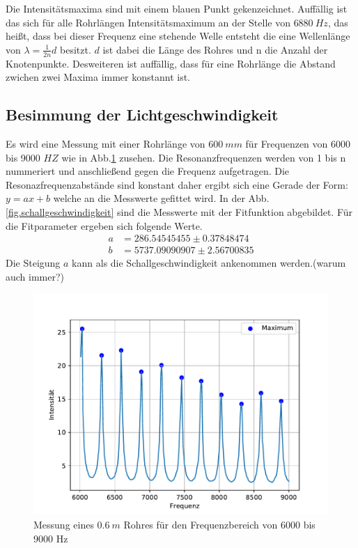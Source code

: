 Die Intensitätsmaxima sind mit einem blauen Punkt gekenzeichnet.
Auffällig ist das sich für alle Rohrlängen Intensitätsmaximum an der Stelle von $\SI{6880}{Hz}$, das heißt, dass bei dieser Frequenz eine stehende Welle entsteht die eine Wellenlänge von $\lambda=\frac{1}{2n}d$ besitzt.
$d$ ist dabei die Länge des Rohres und n die Anzahl der Knotenpunkte.
Desweiteren ist auffällig, dass für eine Rohrlänge die Abstand zwichen zwei Maxima immer konstannt ist.

\subsection{Besimmung der Lichtgeschwindigkeit}
Es wird eine Messung mit einer Rohrlänge von $\SI{600}{mm}$ für Frequenzen von 6000 bis 9000 $\si{HZ}$ wie in Abb.\ref{fig.frequenz/rohrlänge} zusehen.
Die Resonanzfrequenzen werden von 1 bis n nummeriert und anschließend gegen die Frequenz aufgetragen.
Die Resonazfrequenzabstände sind konstant daher ergibt sich eine Gerade der Form: $y=ax+b$ welche an die Messwerte gefittet wird.
In der Abb. \ref{fig.schallgeschwindigkeit} sind die Messwerte mit der Fitfunktion abgebildet.
Für die Fitparameter ergeben sich folgende Werte.
\begin{align*}
  a &= 286.54545455 \pm 0.37848474\\
  b &= 5737.09090907 \pm 2.56700835
\end{align*}
Die Steigung $a$ kann als die Schallgeschwindigkeit ankenommen werden.(warum auch immer?)
\begin{figure}[h!]
  \centering
  \includegraphics[width=\textwidth]{A1L8x75mmF6000-9000S10.pdf}
  \caption{Messung eines $\SI{0.6}{m}$ Rohres für den Frequenzbereich von 6000 bis 9000 Hz}
  \label{fig.frequenz/rohrlänge}
\end{figure}
